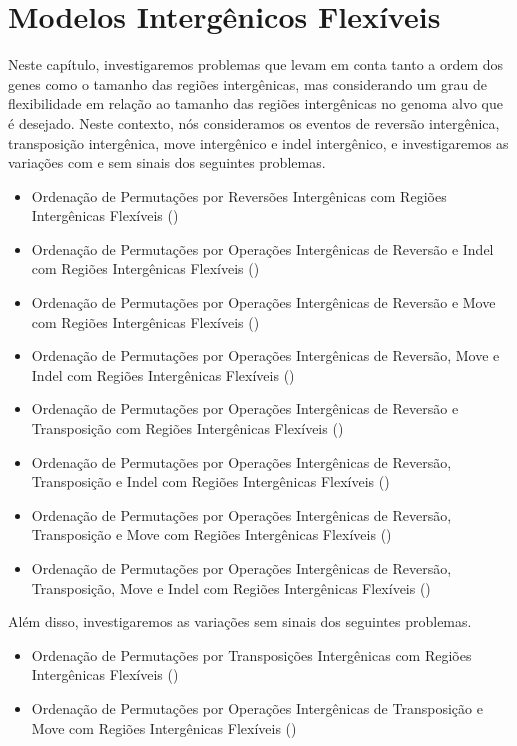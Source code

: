 \chapter{Modelos Intergênicos Flexíveis}\label{chapter:GMJBMTWF}

Neste capítulo, investigaremos problemas que levam em conta tanto a ordem dos genes como o tamanho das regiões intergênicas, mas considerando um grau de flexibilidade em relação ao tamanho das regiões intergênicas no genoma alvo que é desejado. Neste contexto, nós consideramos os eventos de reversão intergênica, transposição intergênica, move intergênico e indel intergênico, e investigaremos as variações com e sem sinais dos seguintes problemas.

\begin{itemize}
  \item Ordenação de Permutações por Reversões Intergênicas com Regiões Intergênicas Flexíveis (\SbFIR)
  \item Ordenação de Permutações por Operações Intergênicas de Reversão e Indel com Regiões Intergênicas Flexíveis (\SbFIRI)
  \item Ordenação de Permutações por Operações Intergênicas de Reversão e Move com Regiões Intergênicas Flexíveis (\SbFIRM)
  \item Ordenação de Permutações por Operações Intergênicas de Reversão, Move e Indel com Regiões Intergênicas Flexíveis (\SbFIRMI)
  \item Ordenação de Permutações por Operações Intergênicas de Reversão e Transposição com Regiões Intergênicas Flexíveis (\SbFIRT)
  \item Ordenação de Permutações por Operações Intergênicas de Reversão, Transposição e Indel com Regiões Intergênicas Flexíveis (\SbFIRTI)
  \item Ordenação de Permutações por Operações Intergênicas de Reversão, Transposição e Move com Regiões Intergênicas Flexíveis (\SbFIRTM)
  \item Ordenação de Permutações por Operações Intergênicas de Reversão, Transposição, Move e Indel com Regiões Intergênicas Flexíveis (\SbFIRTMI)
\end{itemize}

Além disso, investigaremos as variações sem sinais dos seguintes problemas.

\begin{itemize}
  \item Ordenação de Permutações por Transposições Intergênicas com Regiões Intergênicas Flexíveis (\SbFIT)
  \item Ordenação de Permutações por Operações Intergênicas de Transposição e Move com Regiões Intergênicas Flexíveis (\SbFITM)
\end{itemize}

